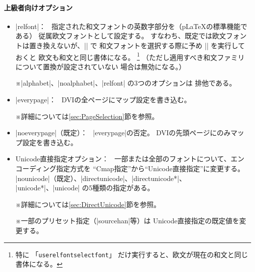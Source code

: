 \documentclass[uplatex,dvipdfmx,a4paper]{jsarticle}
\newcommand{\Pkg}[1]{\textsf{#1}}
\newcommand{\Note}{\par\noindent ※}
\newcommand{\Means}{：\ }
\providecommand{\Strong}[1]{\textsf{#1}}
\providecommand{\pTeX}{p\TeX}
\providecommand{\pLaTeX}{p\LaTeX}
\providecommand{\upTeX}{u\pTeX}
\begin{document}
\paragraph{上級者向けオプション}
\begin{itemize}
\item |relfont|\Means
  指定された和文フォントの英数字部分を（{\pLaTeX}の標準機能である）
  \Strong{従属欧文フォント}として設定する。
  すなわち、既定では欧文フォントは置き換えないが、|\selectfont| で
  和文フォントを選択する際に予め |\userelfont| を実行しておくと
  欧文も和文と同じ書体になる。
  \footnote{特に
  「\texttt{userelfontselectfont}」
  だけ実行すると、欧文が現在の和文と同じ書体になる。}
  （ただし適用すべき和文ファミリについて置換が設定されていない
  場合は無効になる。）
  \Note |alphabet|、|noalphabet|、|relfont| の3つのオプションは
  排他である。
\item |everypage|\Means
  DVIの全ページにマップ設定を書き込む。
  \Note 詳細については\ref{sec:PageSelection}節を参照。
\item |noeverypage|（既定）\Means
  |everypage|の否定。
  DVIの先頭ページにのみマップ設定を書き込む。
\item \Strong{Unicode直接指定オプション}\Means
  一部または全部のフォントについて、エンコーディング指定方式を
  “Cmap指定”から“Unicode直接指定”に変更する。
  |nounicode|（既定）、|directunicode|、|directunicode*|、
  |unicode*|、|unicode| の5種類の指定がある。
  \Note 詳細については\ref{sec:DirectUnicode}節を参照。
  \Note 一部のプリセット指定（|sourcehan|等）は
  Unicode直接指定の既定値を変更する。

\end{itemize}
\end{document}
